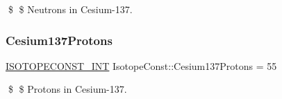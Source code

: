 \$ \$ Neutrons in Cesium-\/137. \mbox{\label{group___isotope_const-_cesium-_cs137_gafc060550409acb828c02fa859cf84b95}} 
\subsubsection{\texorpdfstring{Cesium137\+Protons}{Cesium137Protons}}
{\footnotesize\ttfamily \mbox{\hyperlink{group___isotope_const-_macros_ga5f18360b3e99483a35c32d789e62621c}{I\+S\+O\+T\+O\+P\+E\+C\+O\+N\+S\+T\+\_\+\+I\+NT}} Isotope\+Const\+::\+Cesium137\+Protons = 55}

\$ \$ Protons in Cesium-\/137. 